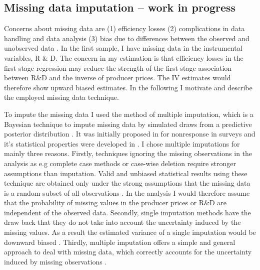 \subsection{Missing data imputation -- work in progress}
Concerns about missing data are (1) efficiency losses (2) complications in data handling and data analysis (3) bias due to differences between the observed and unobserved data \parencite{schafer1998multiple}.
In the first sample, I have missing data in the instrumental variables, R \& D.
The concern in my estimation is that efficiency losses in the first stage regression  may reduce the strength of the first stage association between R\&D and the inverse of producer prices.
 The IV estimates would therefore show upward biased estimates.
In the following I motivate and describe the employed missing data technique.  \par
To impute the missing data I used the method of multiple imputation, which is a Bayesian technique to impute missing data by simulated draws from a predictive posterior distribution \textcite{}.
It was initially proposed in \textcite{rubin1978} for nonresponse in surveys and it's statistical properties were developed in  \textcite{Rubin1987}.
I chose multiple imputations  for mainly three reasons.
Firstly, techniques  ignoring the missing observations in the analysis as e.g complete case methods or case-wise deletion require stronger assumptions than imputation.
Valid and unbiased statistical results using these technique are obtained only under the strong assumptions that the missing data is a random subset of all observations \parencite{bhaskaran}.
In the analysis I would therefore assume that the probability of missing values in the producer prices or R\&D are independent of the observed data.
Secondly, single imputation methods have the draw back that they do not take into account the uncertainty induced by the missing values.
As a result the estimated variance of a single imputation would be downward biased \parencite{Wooldridge} .
Thirdly, multiple imputation offers a  simple and general approach to deal with missing data, which correctly accounts for the uncertainty induced by missing observations \parencite{schafer1998multiple}.
